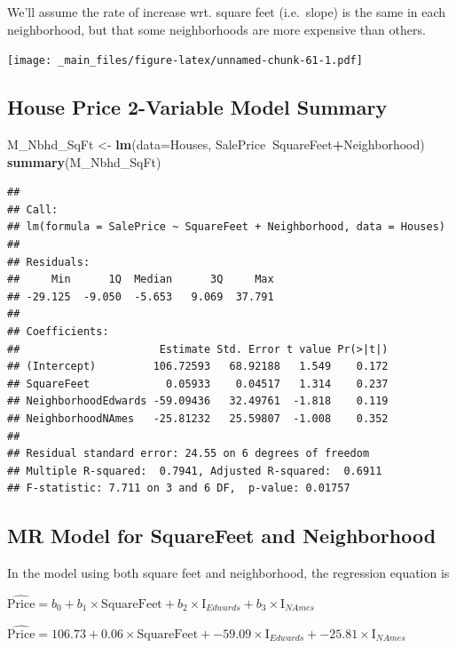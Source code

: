 \documentclass[]{book}
\newenvironment{Shaded}{\begin{snugshade}}{\end{snugshade}}
\newcommand{\KeywordTok}[1]{\textcolor[rgb]{0.13,0.29,0.53}{\textbf{#1}}}
\newcommand{\DataTypeTok}[1]{\textcolor[rgb]{0.13,0.29,0.53}{#1}}
\newcommand{\StringTok}[1]{\textcolor[rgb]{0.31,0.60,0.02}{#1}}
\newcommand{\OperatorTok}[1]{\textcolor[rgb]{0.81,0.36,0.00}{\textbf{#1}}}
\newcommand{\NormalTok}[1]{#1}
\begin{document}
We'll assume the rate of increase wrt. square feet (i.e.~slope) is the
same in each neighborhood, but that some neighborhoods are more
expensive than others.

\texttt{[image: \_main\_files/figure-latex/unnamed-chunk-61-1.pdf]}

\subsection{House Price 2-Variable Model
Summary}\label{house-price-2-variable-model-summary}

\begin{Shaded}
\begin{Highlighting}[]
\NormalTok{M_Nbhd_SqFt <-}\StringTok{ }\KeywordTok{lm}\NormalTok{(}\DataTypeTok{data=}\NormalTok{Houses, SalePrice}\OperatorTok{~}\NormalTok{SquareFeet}\OperatorTok{+}\NormalTok{Neighborhood)}
\KeywordTok{summary}\NormalTok{(M_Nbhd_SqFt)}
\end{Highlighting}
\end{Shaded}

\begin{verbatim}
## 
## Call:
## lm(formula = SalePrice ~ SquareFeet + Neighborhood, data = Houses)
## 
## Residuals:
##     Min      1Q  Median      3Q     Max 
## -29.125  -9.050  -5.653   9.069  37.791 
## 
## Coefficients:
##                      Estimate Std. Error t value Pr(>|t|)
## (Intercept)         106.72593   68.92188   1.549    0.172
## SquareFeet            0.05933    0.04517   1.314    0.237
## NeighborhoodEdwards -59.09436   32.49761  -1.818    0.119
## NeighborhoodNAmes   -25.81232   25.59807  -1.008    0.352
## 
## Residual standard error: 24.55 on 6 degrees of freedom
## Multiple R-squared:  0.7941, Adjusted R-squared:  0.6911 
## F-statistic: 7.711 on 3 and 6 DF,  p-value: 0.01757
\end{verbatim}

\subsection{MR Model for SquareFeet and
Neighborhood}\label{mr-model-for-squarefeet-and-neighborhood}

In the model using both square feet and neighborhood, the regression
equation is

\(\widehat{\text{Price}}= b_0+ b_1 \times\text{SquareFeet}+ b_2\times\text{I}_{Edwards} + b_3 \times\text{I}_{NAmes}\)

\(\widehat{\text{Price}}= 106.73+ 0.06 \times\text{SquareFeet}+ -59.09 \times\text{I}_{Edwards} +-25.81 \times\text{I}_{NAmes}\)
\end{document}
